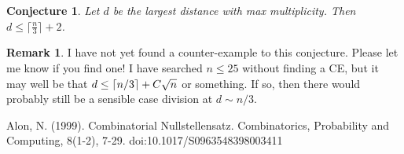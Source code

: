 \documentclass[12]{article}
\newcommand{\Mod}[1]{\ (\mathrm{mod}\ #1)}
\DeclarePairedDelimiter\ceil{\lceil}{\rceil}
\newtheorem{prop}[thm]{Proposition}
\newtheorem{conj}[thm]{Conjecture}
\theoremstyle{definition}
\newtheorem{rem}[thm]{Remark}
\begin{document}
	\begin{conj}
		Let $d$ be the largest distance with max multiplicity.  Then $d \leq \lceil \tfrac{n}{3}\rceil + 2$.
	\end{conj}

	\begin{rem}
		I have not yet found a counter-example to this conjecture.  Please let me know if you find one!  I have searched $n \leq 25$ without finding a CE, but it may well be that $d \leq \ceil{n/3} + C\sqrt{n}$ or something.  If so, then there would probably still be a sensible case division at $d \sim n/3$.
	\end{rem}
	
	

	
	\newpage
	\begin{thebibliography}{100}
		 Alon, N. (1999). Combinatorial Nullstellensatz. Combinatorics, Probability and Computing, 8(1-2), 7-29. doi:10.1017/S0963548398003411
	\end{thebibliography}
	
\end{document}
